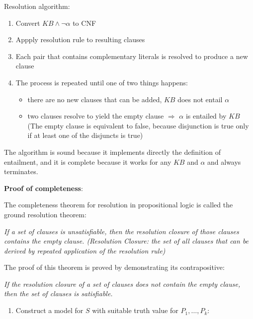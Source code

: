 \documentclass[12pt]{article}
\begin{document}
\begin{enumerate}[label=\textbf{PL.\arabic*}]
    Resolution algorithm:
    \begin{enumerate}[label=\arabic*.]
        \item Convert $KB \land \neg\alpha$ to CNF
        \item Appply resolution rule to resulting clauses
        \item Each pair that contains complementary literals is resolved to produce a new clause
        \item The process is repeated until one of two things happens:
        \begin{itemize}
            \item there are no new clauses that can be added, $KB$ does not entail $\alpha$
            \item two clauses resolve to yield the empty clause $\Rightarrow$ $\alpha$ is entailed by $KB$ (The empty clause is equivalent to false, because disjunction is true only if at least one of the disjuncts is true)
        \end{itemize}
    \end{enumerate}

    The algorithm is sound because it implements directly the definition of entailment, 
    and it is complete because it works for any $KB$ and $\alpha$ and always terminates.

    \textbf{Proof of completeness}:

    The completeness theorem for resolution in propositional logic is called the ground resolution theorem:
    \begin{center}
        \textit{
        If a set of clauses is unsatisfiable, then the resolution closure of those clauses contains the empty clause. 
        (Resolution Closure: the set of all clauses that can be derived by repeated application of the resolution rule)
        }
    \end{center}
    The proof of this theorem is proved by demonstrating its contrapositive:
    \begin{center}
        \textit{
        If the resolution closure of a set of clauses does not contain the empty clause, then the set of clauses is satisfiable.
        }
    \end{center}

    \begin{enumerate}
        \item Construct a model for $S$ with suitable truth value for $P_1,\ldots,P_k$:
        

\end{enumerate}
\end{enumerate}
\end{document}
